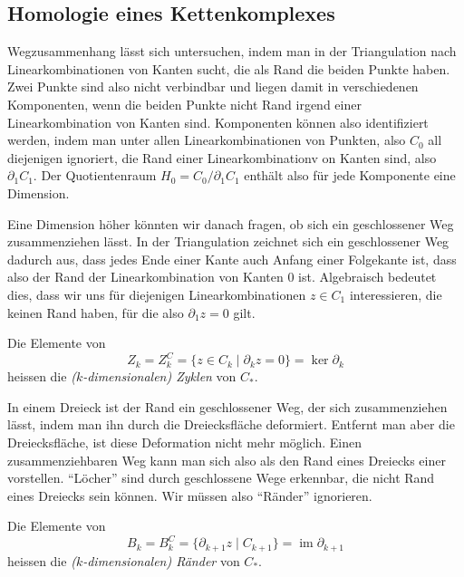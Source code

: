 %
%
%
\subsection{Homologie eines Kettenkomplexes
\label{buch:subsection:homologie-eines-kettenkomplexes}}
Wegzusammenhang lässt sich untersuchen, indem man in der Triangulation
nach Linearkombinationen von Kanten sucht, die als Rand die beiden Punkte
haben.
Zwei Punkte sind also nicht verbindbar und liegen damit in verschiedenen
Komponenten, wenn die beiden Punkte nicht Rand irgend einer
Linearkombination von Kanten sind.
Komponenten können also identifiziert werden, indem man unter allen
Linearkombinationen von Punkten, also $C_0$ all diejenigen ignoriert,
die Rand einer Linearkombinationv on Kanten sind, also $\partial_1C_1$.
Der Quotientenraum $H_0=C_0/\partial_1C_1$ enthält also für jede Komponente
eine Dimension.

Eine Dimension höher könnten wir danach fragen, ob sich ein geschlossener
Weg zusammenziehen lässt.
In der Triangulation zeichnet sich ein geschlossener Weg dadurch aus,
dass jedes Ende einer Kante auch Anfang einer Folgekante ist, dass also
der Rand der Linearkombination von Kanten 0 ist.
Algebraisch bedeutet dies, dass wir uns für diejenigen Linearkombinationen
$z\in C_1$ interessieren, die keinen Rand haben, für die also $\partial_1z=0$
gilt.

\begin{definition}
Die Elemente von
\[
Z_k
=
Z_k^C
=
\{z\in C_k\;|\; \partial_k z = 0\}
=
\ker \partial_k
\]
heissen die {\em ($k$-dimensionalen) Zyklen} von $C_*$.
\end{definition}

In einem Dreieck ist der Rand ein geschlossener Weg, der sich zusammenziehen
lässt, indem man ihn durch die Dreiecksfläche deformiert.
Entfernt man aber die Dreiecksfläche, ist diese Deformation nicht mehr
möglich.
Einen zusammenziehbaren Weg kann man sich also als den Rand eines Dreiecks
einer vorstellen.
``Löcher'' sind durch geschlossene Wege erkennbar, die nicht Rand eines
Dreiecks sein können.
Wir müssen also ``Ränder'' ignorieren.

\begin{definition}
Die Elemente von
\[
B_k
=
B_k^C
=
\{\partial_{k+1}z\;|\; C_{k+1}\}
=
\operatorname{im} \partial_{k+1}
\]
heissen die {\em ($k$-dimensionalen) Ränder} von $C_*$.
\end{definition}

